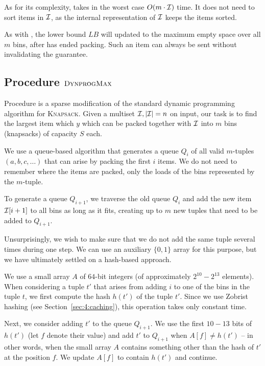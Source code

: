 As for its complexity, \bfd takes in the worst case $O(m \cdot {\mathcal I})$
time. It does not need to sort items in ${\mathcal I}$, as the internal
representation of ${\mathcal I}$ keeps the items sorted.

As with \obf, the lower bound $LB$ will updated to the maximum empty
space over all $m$ bins, after \bfd has ended packing. Such an item
can always be sent without invalidating the \binstretch guarantee.

\subsection{Procedure $\textsc{DynprogMax}$}\label{sec:4:dynprogmax}

Procedure \DynprogMax is a sparse modification of the standard dynamic
programming algorithm for \textsc{Knapsack}. Given a multiset ${\mathcal I},
|{\mathcal I}| = n$ on input, our task is to find the largest item which $y$
which can be packed together with ${\mathcal I}$ into $m$ bins (knapsacks) of
capacity $S$ each.


We use a queue-based algorithm that generates a queue $Q_i$ of all
valid $m$-tuples $(a,b,c,\ldots)$ that can arise by packing the first
$i$ items. We do not need to remember where the items are packed, only
the loads of the bins represented by the $m$-tuple.

To generate a queue $Q_{i+1}$, we traverse the old queue $Q_i$ and add
the new item ${\mathcal I}[i+1]$ to all bins as long as it fits, creating up
to $m$ new tuples that need to be added to $Q_{i+1}$.

Unsurprisingly, we wish to make sure that we do not add the same tuple
several times during one step. We can use an auxiliary $\{0,1\}$ array
for this purpose, but we have ultimately settled on a hash-based
approach.

We use a small array $A$ of $64$-bit integers (of approximately $2^{10} -
2^{13}$ elements). When considering a tuple $t'$ that arises from
adding $i$ to one of the bins in the tuple $t$, we first compute the
hash $h(t')$ of the tuple $t'$. Since we use Zobrist hashing (see
Section~\ref{sec:4:caching}), this operation takes only constant time.

Next, we consider adding $t'$ to the queue $Q_{i+1}$. We use the first
$10-13$ bits of $h(t')$ (let $f$ denote their value) and add $t'$ to
$Q_{i+1}$ when $A[f] \neq h(t')$ -- in other words, when the small
array $A$ contains something other than the hash of $t'$ at the
position $f$. We update $A[f]$ to contain $h(t')$ and continue.

